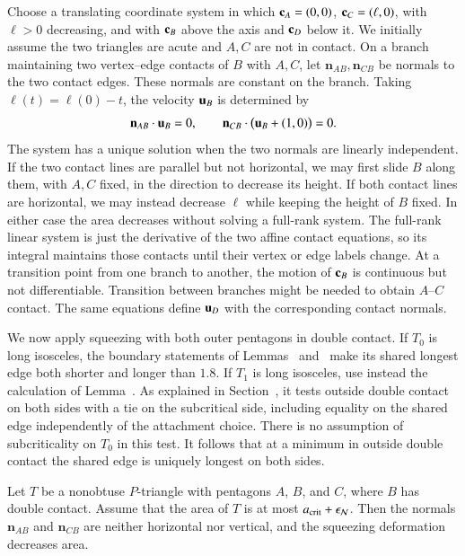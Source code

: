 Choose a translating coordinate system in which
${\mathbf c}_A=(0,0)$, ${\mathbf c}_C=(\ell,0)$, with $\ell>0$ decreasing,
and with ${\mathbf c}_B$ above the axis and ${\mathbf c}_D$ below it.  We
initially assume the two triangles are acute and $A,C$ are not
in contact.  On a branch maintaining two vertex--edge contacts of
$B$ with $A,C$, let $\mathbf{n}_{AB},\mathbf{n}_{CB}$ be normals to the two
contact edges.  These normals are constant on the branch.  Taking
$\ell(t)=\ell(0)-t$, the velocity ${\mathbf u}_B$ is determined by
\[
\mathbf{n}_{AB}\cdot {\mathbf u}_B=0,\qquad
\mathbf{n}_{CB}\cdot\bigl({\mathbf u}_B+(1,0)\bigr)=0.
\]
The system has a unique solution when the two normals are linearly
independent.  If the two contact lines are parallel but not horizontal, we may
first slide $B$ along them, with $A,C$ fixed, in the direction to
decrease its height. If both contact lines are horizontal, we may
instead decrease $\ell$ while keeping the height of $B$ fixed. In
either case the area decreases without solving a full-rank system.
The full-rank linear system is just the derivative of the two affine contact
equations, so its integral maintains those contacts until their
vertex or edge labels change.  At a transition point from one branch to
another, the motion of ${\mathbf c}_B$ is continuous but not differentiable.
Transition between branches might be needed to obtain $A$--$C$ contact.
The same equations define ${\mathbf u}_D$
with the corresponding contact normals.

We now apply squeezing with both outer pentagons in double contact.
If $T_0$ is long isosceles, the boundary statements of
Lemmas~ and~ make its shared
longest edge both shorter and longer than $1.8$. If $T_1$ is long
isosceles, use instead the calculation of Lemma~.
As explained in Section~, it tests outside double
contact on both sides with a tie on the subcritical side, including
equality on the shared edge independently of the attachment choice.
There is no assumption of subcriticality on $T_0$ in this test.
It follows that at a minimum in outside double contact the shared
edge is uniquely longest on both sides.

\begin{lemma}
  Let $T$ be a nonobtuse $P$-triangle with pentagons $A$, $B$, and
  $C$, where $B$ has double contact.  Assume that the area of $T$ is  at most $a_\text{crit}+\epsilon_{\mathcal N}$.
   Then the normals $\mathbf n_{AB}$ and $\mathbf n_{CB}$ are
   neither horizontal nor vertical, and the squeezing deformation
   decreases area.
\end{lemma}

